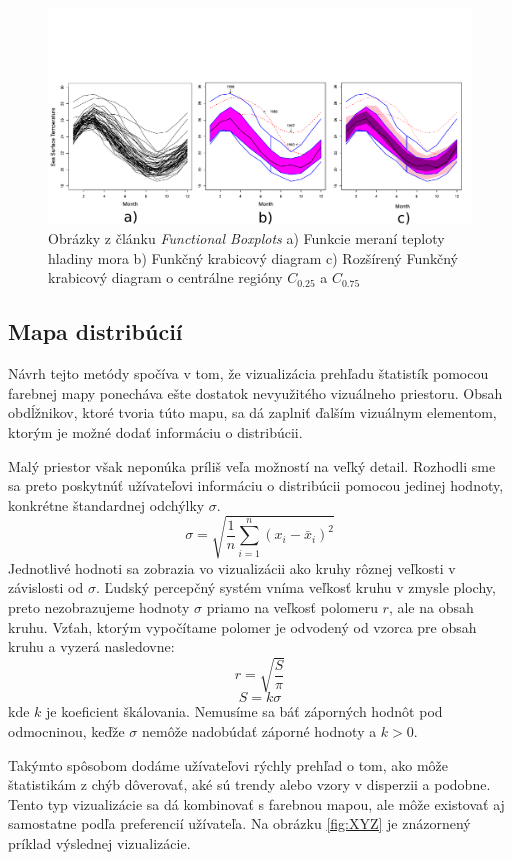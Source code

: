 \begin{figure}
	\centering
	\hspace*{-0.9in}
	\includegraphics[width = 7.5in]{functionalboxplot}
	\caption{Obrázky z článku \textit{Functional Boxplots}  \cite{FunctionalBoxplot}  a) Funkcie meraní teploty hladiny mora b) Funkčný krabicový diagram c) Rozšírený Funkčný krabicový diagram o centrálne regióny $ C_{0.25} $ a $ C_{0.75} $ }
	\label{fig:functionalboxplot}
\end{figure}

\subsection{Mapa distribúcií} 
Návrh tejto metódy spočíva v tom, že vizualizácia prehľadu štatistík pomocou farebnej mapy ponecháva ešte dostatok nevyužitého vizuálneho priestoru. Obsah obdĺžnikov, ktoré tvoria túto mapu, sa dá zaplniť ďalším vizuálnym elementom, ktorým je možné dodať informáciu o distribúcii.

Malý priestor však neponúka príliš veľa možností na veľký detail. Rozhodli sme sa preto poskytnúť užívateľovi informáciu o distribúcii pomocou jedinej hodnoty, konkrétne štandardnej odchýlky $ \sigma $. 
\[
	\sigma = \sqrt{\frac{1}{n} \sum_{i=1}^{n}(x_{i} - \bar{x}_{i})^2  }
\]
Jednotlivé hodnoti sa zobrazia vo vizualizácii ako kruhy rôznej veľkosti v závislosti od $ \sigma $. Ľudský percepčný systém vníma veľkosť kruhu v zmysle plochy, preto nezobrazujeme hodnoty $ \sigma $ priamo na veľkosť polomeru $ r $, ale na obsah kruhu. Vzťah, ktorým vypočítame polomer je odvodený od vzorca pre obsah kruhu a vyzerá nasledovne:
\[
	r = \sqrt{\frac{S}{\pi}}
\]
\[
	S = k\sigma
\]
kde $ k $ je koeficient škálovania. Nemusíme sa báť záporných hodnôt pod odmocninou, keďže $ \sigma $ nemôže nadobúdať záporné hodnoty a $ k > 0 $.

Takýmto spôsobom dodáme užívateľovi rýchly prehľad o tom, ako môže štatistikám z chýb dôverovať, aké sú trendy alebo vzory v disperzii a podobne. Tento typ vizualizácie sa dá kombinovať s farebnou mapou, ale môže existovať aj samostatne podľa preferencií užívateľa. Na obrázku \ref{fig:XYZ} je znázornený príklad výslednej vizualizácie.

